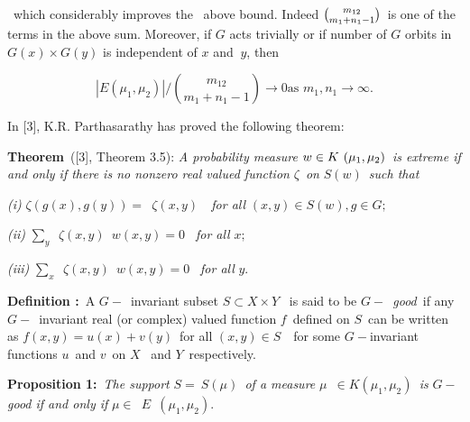 \documentclass{article}
\begin{document}
{\large \ which considerably improves the \ above bound. Indeed $\binom{%
m_{12}}{m_{1}+n_{1}-1}$\ is one of the terms in the above sum. Moreover, if $%
G$ acts trivially or if number of $G$ orbits in $G(x)\times G(y)$ is
independent of $x$ and $\ y$, then }

{\large
\begin{equation*}
|E(\mu _{1},\mu _{2})|/\binom{m_{12}}{m_{1}+n_{1}-1}\longrightarrow 0\text{
\ \ as }m_{1},n_{1}\longrightarrow \infty .
\end{equation*}
}

{\large \bigskip }

{\large In [3], K.R. Parthasarathy has proved the following theorem: }

{\large \bigskip }

{\large \textbf{Theorem}\ ([3], Theorem 3.5): \emph{A probability measure }$%
w\in K\emph{\ }(\mu _{1},\mu _{2})$\emph{\ is extreme if and only if there
is no nonzero real valued function }$\zeta $\emph{\ on }$S(w)$\emph{\ such
that} }

{\large \emph{(i) }$\zeta (g(x),g(y))=$\emph{\ }$\zeta (x,y)$\emph{\ \ for
all }$(x,y)\in S(w),g\in G;$ }

{\large \emph{(ii) }$\sum_{y}$\emph{\ }$\zeta (x,y)$\emph{\ }$w(x,y)=0$\emph{%
\ for all }$x;$ }

{\large \emph{(iii) }$\sum_{x}$\emph{\ }$\zeta (x,y)$\emph{\ }$w(x,y)=0$%
\emph{\ for all }$y.$ }

{\large \emph{\bigskip } }

{\large \textbf{Definition :}\ A $G-$\ invariant subset $S\subset X\times Y$%
\ is said to be $G-$\emph{\ good}\ if any $G-$\ invariant real (or complex)
valued function $f$\ defined on $S$\ can be written as $f(x,y)=u(x)+v(y)$\
for all $(x,y)\in S$\ \ for some $G-$invariant functions $u$\ and $v$\ on $X$%
\ and $Y$\ respectively. }

{\large \bigskip }

{\large \textbf{Proposition 1:}\ \emph{The support }$S=\ S(\mu )$\emph{\ of
a measure }$\mu $\emph{\ }$\in K(\mu _{1},\mu _{2})$\emph{\ is }$G-$\emph{%
good if and only if }$\mu \in $\emph{\ }$E$\emph{\ }$(\mu _{1},\mu _{2}).$ }

{\large \medskip }
\end{document}
